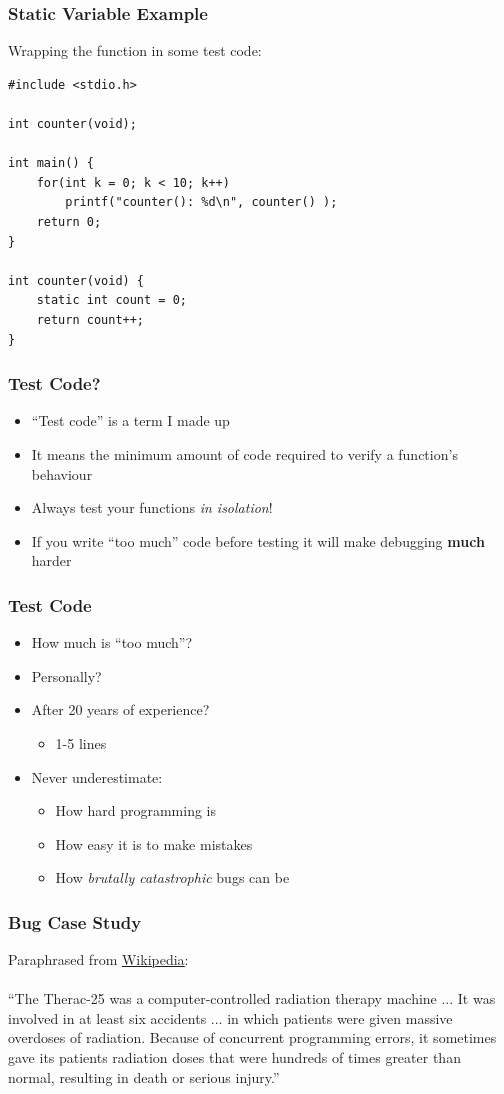\documentclass[14pt]{beamer}
\begin{document}
\begin{frame}[fragile]
\frametitle{Static Variable Example}
Wrapping the function in some test code:
\begin{lstlisting}[style=CStyle]
#include <stdio.h>

int counter(void);

int main() {
	for(int k = 0; k < 10; k++)
		printf("counter(): %d\n", counter() );
	return 0;
}

int counter(void) {
	static int count = 0;
	return count++;
}
\end{lstlisting}
\end{frame}

\begin{frame}
\frametitle{Test Code?}
\begin{itemize}
\item ``Test code'' is a term I made up
\item It means the minimum amount of code required to verify a function's behaviour
\item Always test your functions \textit{in isolation}!
\pause
\item If you write ``too much'' code before testing it will make debugging \textbf{much} harder
\end{itemize}
\end{frame}

\begin{frame}
\frametitle{Test Code}
\begin{itemize}
\item How much is ``too much''?
\pause
\item Personally?
\pause
\item After 20 years of experience?
\pause
	\begin{itemize}
		\item 1-5 lines
	\end{itemize}
\pause
\item Never underestimate:
	\begin{itemize}
		\item How hard programming is
		\item How easy it is to make mistakes
		\item How \textit{brutally catastrophic} bugs can be
	\end{itemize}
\end{itemize}
\end{frame}

\begin{frame}
\frametitle{Bug Case Study}
Paraphrased from \underline{\href{https://en.wikipedia.org/wiki/Therac-25}{Wikipedia}}:
\\~\\
``The Therac-25 was a computer-controlled radiation therapy machine ... It was involved in at least six accidents ...  in which patients were given massive overdoses of radiation. Because of concurrent programming errors, it sometimes gave its patients radiation doses that were hundreds of times greater than normal, resulting in death or serious injury.''
\end{frame}
\end{document}
